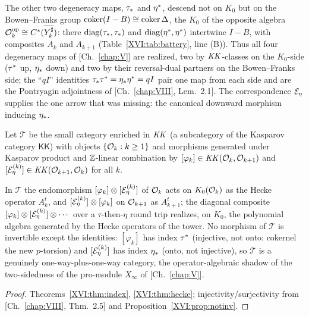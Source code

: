 \begin{remark}\label{XVI:rem:opposite}
The other two degeneracy maps, $\tau_*$ and $\eta^*$, descend not on $K_0$ but on the
Bowen--Franks group $\operatorname{coker}(I-B)\cong\operatorname{coker}\Delta$, the $K_0$ of the opposite algebra
$\mathcal{O}_k^{\mathrm{op}}\cong C^*(\overline{Y_{k}^{\sharp}})$: there
$\operatorname{diag}(\tau_*,\tau_*)$ and $\operatorname{diag}(\eta^*,\eta^*)$ intertwine $I-B$, with
composites $A_k$ and $A_{k+1}$ (Table~\ref{XVI:tab:battery}, line (B)). Thus all four
degeneracy maps of [Ch.~\ref{chap:V}] are realized, two by $\mathit{KK}$-classes on the $K_0$-side ($\tau^*$ up,
$\eta_*$ down) and two by their reversal-dual partners on the Bowen--Franks side; the
``$qI$'' identities $\tau_*\tau^*=\eta_*\eta^*=qI$ pair one map from each side and are the
Pontryagin adjointness of [Ch.~\ref{chap:VIII}, Lem.~2.1]. The correspondence $\mathcal{E}_\eta$ supplies the one
arrow that was missing: the canonical downward morphism inducing $\eta_*$.
\end{remark}

\begin{definition}\label{XVI:def:cat}
Let $\mathcal{T}$ be the small category enriched in $\mathit{KK}$ (a subcategory of the Kasparov
category $\mathsf{KK}$) with objects $\{\mathcal{O}_k:k\ge1\}$ and morphisms generated under
Kasparov product and $\mathbb{Z}$-linear combination by $[\varphi_k]\in\mathit{KK}(\mathcal{O}_k,\mathcal{O}_{k+1})$ and
$[\mathcal{E}_\eta^{(k)}]\in\mathit{KK}(\mathcal{O}_{k+1},\mathcal{O}_k)$ for all $k$.
\end{definition}

\begin{corollary}\label{XVI:cor:cat}
In $\mathcal{T}$ the endomorphism $[\varphi_k]\otimes[\mathcal{E}_\eta^{(k)}]$ of $\mathcal{O}_k$ acts on
$K_0(\mathcal{O}_k)$ as the Hecke operator $A_k^{t}$, and $[\mathcal{E}_\eta^{(k)}]\otimes[\varphi_k]$ on
$\mathcal{O}_{k+1}$ as $A_{k+1}^{t}$; the diagonal composite
$[\varphi_k]\otimes[\mathcal{E}_\eta^{(k)}]\otimes\cdots$ over a $\tau$-then-$\eta$ round trip
realizes, on $K_0$, the polynomial algebra generated by the Hecke operators of the tower.
No morphism of $\mathcal{T}$ is invertible except the identities: $[\varphi_k]$ has index
$\tau^*$ (injective, not onto: cokernel the new $p$-torsion) and $[\mathcal{E}_\eta^{(k)}]$ has index
$\eta_*$ (onto, not injective), so $\mathcal{T}$ is a genuinely one-way-plus-one-way category,
the operator-algebraic shadow of the two-sidedness of the pro-module $X_\infty$ of [Ch.~\ref{chap:V}].
\end{corollary}

\begin{proof}
Theorems~\ref{XVI:thm:index}, \ref{XVI:thm:hecke}; injectivity/surjectivity from [Ch.~\ref{chap:VIII}, Thm.~2.5]
and Proposition~\ref{XVI:prop:notinv}.
\end{proof}

